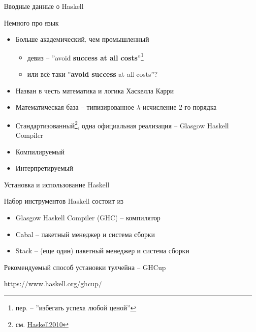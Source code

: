 \documentclass{beamer}
\begin{document}
  \begin{frame}{Вводные данные о Haskell}
      \begin{block}{Немного про язык}
        \begin{itemize}
            \item Больше академический, чем промышленный
                \begin{itemize}
                    \item девиз -- ''avoid \textbf{success at all costs}''\footnote{пер. -- ''избегать успеха любой ценой''}
                    \item или всё-таки ''\textbf{avoid success} at all costs''?
                \end{itemize}
            \item Назван в честь математика и логика Хаскелла Карри
            \item Математическая база -- типизированное $\lambda$-исчисление 2-го порядка
            \item Стандартизованный\footnote{см. \alert{\href{https://www.haskell.org/onlinereport/haskell2010/}{Haskell2010}}}, одна официальная реализация -- Glasgow Haskell Compiler
            \item Компилируемый
            \item Интерпретируемый
        \end{itemize}
      \end{block}
  \end{frame}
  \begin{frame}{Установка и использование Haskell}
      \begin{block}{Набор инструментов Haskell состоит из}
\begin{itemize}
    \item Glasgow Haskell Compiler (GHC) -- компилятор
    \item Cabal -- пакетный менеджер и система сборки
    \item Stack -- (еще один) пакетный менеджер и система сборки
\end{itemize}
      \end{block}
      \begin{block}{Рекомендуемый способ установки тулчейна -- GHCup}
        
        \center\alert{{\url{https://www.haskell.org/ghcup/}}}
      \end{block}
  \end{frame}
\end{document}
